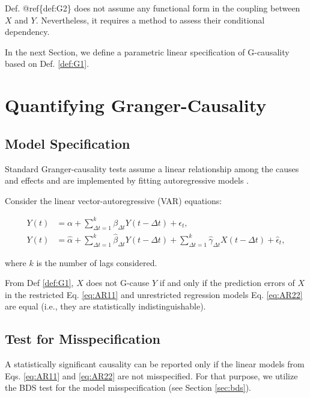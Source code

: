 \documentclass[]{book}
\theoremstyle{definition}
\theoremstyle{definition}
\theoremstyle{definition}
\theoremstyle{remark}
\begin{document}
Def. @ref\{def:G2\} does not assume any functional form in the coupling
between \(X\) and \(Y\). Nevertheless, it requires a method to assess
their conditional dependency.

In the next Section, we define a parametric linear specification of
G-causality based on Def. \ref{def:G1}.

\section{Quantifying
Granger-Causality}\label{quantifying-granger-causality}

\subsection{Model Specification}\label{model-specification}

Standard Granger-causality tests assume a linear relationship among the
causes and effects and are implemented by fitting autoregressive models
\cite{Wiener56, granger:econ}.

Consider the linear vector-autoregressive (VAR) equations:

\begin{align}
Y(t) &= {\alpha} + \sum^k_{\Delta t=1}{{\beta}_{\Delta t} Y(t-\Delta t)} + \epsilon_t, \label{eq:AR11}\\
Y(t) &= \widehat{\alpha} + \sum^k_{\Delta t=1}{{\widehat{\beta}}_{\Delta t} Y(t-\Delta t)} +  \sum^k_{\Delta t=1}{{\widehat{\gamma}}_{\Delta t}X(t-\Delta t)}+ \widehat{\epsilon}_t, \label{eq:AR22}
\end{align}

where \(k\) is the number of lags considered.

From Def \ref{def:G1}, \(X\) does not G-cause \(Y\) if and only if the
prediction errors of \(X\) in the restricted Eq. \eqref{eq:AR11} and
unrestricted regression models Eq. \eqref{eq:AR22} are equal (i.e., they
are statistically indistinguishable).

\subsection{Test for Misspecification}\label{test-for-misspecification}

A statistically significant causality can be reported only if the linear
models from Eqs. \eqref{eq:AR11} and \eqref{eq:AR22} are not misspecified.
For that purpose, we utilize the BDS test \cite{citeulike:9300127} for
the model misspecification (see Section \ref{sec:bds}).
\end{document}
